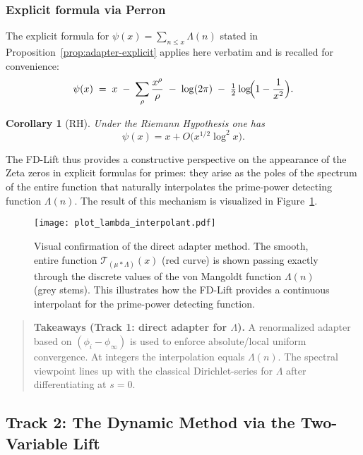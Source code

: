 \documentclass[11pt,a4paper]{amsart}
\theoremstyle{plain}
\newtheorem{corollary}[theorem]{Corollary}
\theoremstyle{definition}
\theoremstyle{remark}
\begin{document}
\subsubsection{Explicit formula via Perron}
The explicit formula for $\psi(x)=\sum_{n\le x}\Lambda(n)$ stated in Proposition~\ref{prop:adapter-explicit} applies here verbatim and is recalled for convenience:
\[
\psi(x)\;=\; x \;-\; \sum_{\rho}\frac{x^{\rho}}{\rho} \;-\; \log(2\pi) \;-\; \tfrac{1}{2}\log\!\Bigl(1-\frac{1}{x^{2}}\Bigr).
\]

\begin{corollary}[RH]
Under the Riemann Hypothesis one has
\[
\psi(x) = x + O\!\big(x^{1/2}\log^{2}x\big).
\]
\end{corollary}

The FD-Lift thus provides a constructive perspective on the appearance of the Zeta zeros in explicit formulas for primes: they arise as the poles of the spectrum of the entire function that naturally interpolates the prime-power detecting function $\Lambda(n)$. The result of this mechanism is visualized in Figure~\ref{fig:lambda_interpolant}.

\begin{figure}[t]
\centering
\texttt{[image: plot\_lambda\_interpolant.pdf]}
\caption{Visual confirmation of the direct adapter method. The smooth, entire function $\mathcal{T}_{(\mu*\Lambda)}(x)$ (red curve) is shown passing exactly through the discrete values of the von Mangoldt function $\Lambda(n)$ (grey stems). This illustrates how the FD-Lift provides a continuous interpolant for the prime-power detecting function.}
\label{fig:lambda_interpolant}
\end{figure}

\FloatBarrier

\begin{quote}\small
\textbf{Takeaways (Track 1: direct adapter for $\Lambda$).}
A renormalized adapter based on $(\phi_i-\phi_\infty)$ is used to enforce absolute/local uniform convergence.
At integers the interpolation equals $\Lambda(n)$.
The spectral viewpoint lines up with the classical Dirichlet-series for $\Lambda$ after differentiating at $s=0$.
\end{quote}

\subsection{Track 2: The Dynamic Method via the Two-Variable Lift}\label{sec:dynamic-method}
\end{document}
